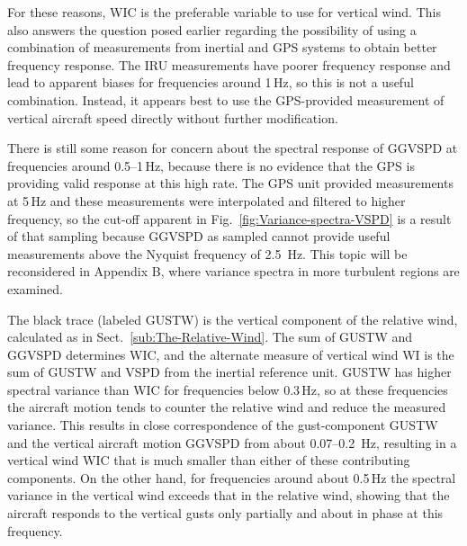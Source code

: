 \documentclass[12pt,twoside,english]{article}\usepackage[]{graphicx}\usepackage[]{color}
\let\OrgIndex\index
\renewcommand*{\index}[1]{\OrgIndex{#1}}
\begin{document}
For these reasons, WIC is the preferable variable to use for vertical wind. This also answers the question posed earlier regarding the possibility of using a combination of measurements from inertial and GPS systems to obtain better frequency response. The IRU measurements have poorer frequency response and lead to apparent biases for frequencies around 1\,Hz, so this is not a useful combination. Instead, it appears best to use the GPS-provided measurement of vertical aircraft speed directly without further modification. 

There is still some reason for concern about the spectral response of GGVSPD at frequencies around 0.5--1\,Hz, because there is no evidence that the GPS is providing valid response at this high rate. The GPS unit provided measurements at 5\,Hz and these measurements were interpolated and filtered to higher frequency, so the cut-off apparent in Fig.~\ref{fig:Variance-spectra-VSPD} is a result of that sampling because GGVSPD as sampled cannot provide useful measurements above the Nyquist frequency of 2.5~Hz. This topic will be reconsidered in Appendix B, where variance spectra in more turbulent regions are examined. 

The black trace (labeled GUSTW) is the vertical component of the relative wind, calculated as in Sect.~\ref{sub:The-Relative-Wind}. The sum of GUSTW and GGVSPD determines WIC, and the alternate measure of vertical wind WI is the sum of GUSTW and VSPD from the inertial reference unit. GUSTW has higher spectral variance than WIC for frequencies below 0.3\,Hz, so at these frequencies the aircraft motion tends to counter the relative wind and reduce the measured variance. This results in close correspondence of the gust-component GUSTW and the vertical aircraft motion GGVSPD from about 0.07--0.2~Hz, resulting in a vertical wind WIC that is much smaller than either of these contributing components. On the other hand, for frequencies around about 0.5\,Hz the spectral variance in the vertical wind exceeds that in the relative wind, showing that the aircraft responds to the vertical gusts only partially and about in phase at this frequency. 
\end{document}
